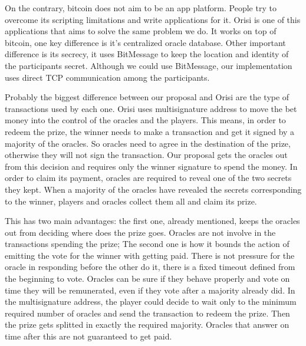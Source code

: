 On the contrary, bitcoin does not aim to be an app platform.
People try to overcome its scripting limitations and write applications for it.
Orisi is one of this applications that aims to solve the same problem we do.
It works on top of bitcoin, one key difference is it's centralized oracle
  database.
Other important difference is its secrecy, it uses BitMessage to keep the
  location and identity of the participants secret.
Although we could use BitMessage, our implementation uses direct TCP
  communication among the participants.

Probably the biggest difference between our proposal and Orisi are the type of
  transactions used by each one.
Orisi uses multisignature address to move the bet money into the control of
  the oracles and the players.
This means, in order to redeem the prize, the winner needs to make a transaction
  and get it signed by a majority of the oracles.
So oracles need to agree in the destination of the prize, otherwise they will
  not sign the transaction.
Our proposal gets the oracles out from this decision and requires only the
  winner signature to spend the money.
In order to claim its payment, oracles are required to reveal one of the two
  secrets they kept.
When a majority of the oracles have revealed the secrets corresponding to the
  winner, players and oracles collect them all and claim its prize.

This has two main advantages: the first one, already mentioned, keeps the
  oracles out from deciding where does the prize goes.
Oracles are not involve in the transactions spending the prize;
The second one is how it bounds the action of emitting the vote for the winner
  with getting paid.
There is not pressure for the oracle in responding before the other do it,
  there is a fixed timeout defined from the beginning to vote.
Oracles can be sure if they behave properly and vote on time they will be
  remunerated, even if they vote after a majority already did.
In the multisignature address, the player could decide to wait only to the
  minimum required number of oracles and send the transaction to redeem the
  prize.
Then the prize gets splitted in exactly the required majority.
Oracles that answer on time after this are not guaranteed to get paid.
